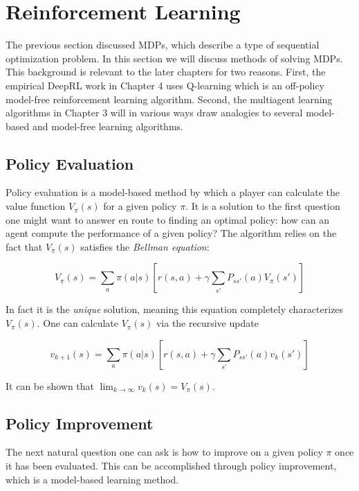 \section{Reinforcement Learning}

The previous section discussed MDPs, which describe a type of sequential optimization problem. In this section we will discuss methods of solving MDPs. This background is relevant to the later chapters for two reasons. First, the empirical DeepRL work in Chapter 4 uses Q-learning which is an off-policy model-free reinforcement learning algorithm. Second, the multiagent learning algorithms in Chapter 3 will in various ways draw analogies to several model-based and model-free learning algorithms.

\subsection{Policy Evaluation}

Policy evaluation is a model-based method by which a player can calculate the value function $V_{\pi}(s)$ for a given policy $\pi$. It is a solution to the first question one might want to answer en route to finding an optimal policy: how can an agent compute the performance of a given policy? The algorithm relies on the fact that $V_{\pi}(s)$ satisfies the {\em Bellman equation}:

\begin{equation}
    V_{\pi}(s) = \sum_a \pi(a | s) \left[ r(s,a) + \gamma \sum_{s'} P_{ss'}(a) V_{\pi}(s') \right]
    \label{bellman}
\end{equation}

In fact it is the {\em unique} solution, meaning this equation completely characterizes $V_{\pi}(s)$. One can calculate $V_{\pi}(s)$ via the recursive update

\begin{equation}
    v_{k+1}(s) = \sum_a \pi(a | s) \left[ r(s,a) + \gamma \sum_{s'} P_{ss'}(a)v_k(s') \right]
    \label{policyeval}
\end{equation}

It can be shown that $\lim_{k \rightarrow \infty} v_k(s) = V_{\pi}(s)$. 

\subsection{Policy Improvement}

The next natural question one can ask is how to improve on a given policy $\pi$ once it has been evaluated. This can be accomplished through policy improvement, which is a model-based learning method. 

